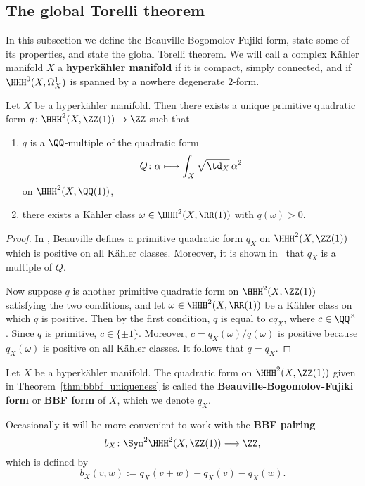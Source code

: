 \subsection{The global Torelli theorem}
In this subsection we define the Beauville-Bogomolov-Fujiki form, state some of its properties, and state the global Torelli theorem. We will call a complex K\"ahler manifold $X$ a {\bfseries hyperk\"ahler manifold} if it is compact, simply connected, and if $\HHH^0(X,\Omega^1_X)$ is spanned by a nowhere degenerate $2$-form.

\begin{theorem}\label{thm:bbbf_uniqueness}
Let $X$ be a hyperk\"ahler manifold. Then there exists a unique primitive quadratic form $q\colon \HHH^2(X,\ZZ(1)) \rightarrow \ZZ$ such that
\begin{enumerate}
\item $q$ is a $\QQ$-multiple of the quadratic form
$$
Q\colon \alpha \longmapsto \int_X \sqrt{\td_X} \, \alpha^2
$$
on $\HHH^2(X,\QQ(1))$,
\item there exists a K\"ahler class $\omega \in \HHH^2(X,\RR(1))$ with $q(\omega) > 0$.
\end{enumerate}
\end{theorem}
\begin{proof}
In \cite[Th\'eor\`eme 5]{Beauville}, Beauville defines a primitive quadratic form $q_X$ on $\HHH^2(X,\ZZ(1))$ which is positive on all K\"ahler classes. Moreover, it is shown in~\cite[Remark 4.12]{Fujiki} that $q_X$ is a multiple of $Q$.

Now suppose $q$ is another primitive quadratic form on $\HHH^2(X,\ZZ(1))$ satisfying the two conditions, and let $\omega \in \HHH^2(X,\RR(1))$ be a K\"ahler class on which $q$ is positive. Then by the first condition, $q$ is equal to $c q_X$, where $c \in \QQ^{\times}$. Since $q$ is primitive, $c \in \{\pm 1\}$. Moreover, $c = q_X(\omega)/q(\omega)$ is positive because $q_X(\omega)$ is positive on all K\"ahler classes. It follows that $q = q_X$.
\end{proof}

\begin{definition}\label{def:bbbf}
Let $X$ be a hyperk\"ahler manifold. The quadratic form on $\HHH^2(X,\ZZ(1))$ given in Theorem~\ref{thm:bbbf_uniqueness} is called the {\bfseries Beauville-Bogomolov-Fujiki form} or {\bfseries BBF form} of $X$, which we denote $q_X$.

Occasionally it will be more convenient to work with the {\bfseries BBF pairing}
$$
b_X\colon \Sym^2 \HHH^2(X,\ZZ(1)) \longrightarrow \ZZ,
$$
which is defined by
$$
b_X(v,w) := q_X(v + w) - q_X(v) - q_X(w).
$$
\end{definition}

